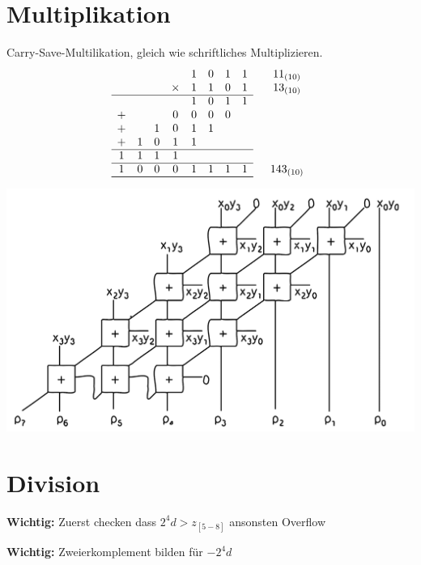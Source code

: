 \documentclass[a4paper,6pt]{article}
\begin{document}
\begin{multicols*}{3}
\section{Multiplikation}

Carry-Save-Multilikation, gleich wie schriftliches Multiplizieren.
$$
\begin{array}{cccccccccc}
      &   &   &   & 1 & 0 & 1 & 1 &   & 11_{(10)} \\
      &   &   & \times & 1 & 1 & 0 & 1 &   & 13_{(10)} \\ \cline{1-8}
      &   &   &   & 1 & 0 & 1 & 1 &   &  \\
    + &   &   & 0 & 0 & 0 & 0 &   &   &  \\
    + &   & 1 & 0 & 1 & 1 &   &   &   &  \\
    + & 1 & 0 & 1 & 1 &   &   &   &   &  \\ \cline{1-8}
    1 & 1 & 1 & 1 &   &   &   &   &   &  \\ \cline{1-8}
    1 & 0 & 0 & 0 & 1 & 1 & 1 & 1 &   & 143_{(10)} \\ \cline{1-8} \cline{1-8}
\end{array}
$$

\begin{center}
    \includegraphics[width=1\linewidth]{resources/Multiplier.png}
\end{center}

\section{Division}


\textbf{Wichtig:} Zuerst checken dass $2^4 d > z_{[5-8]}$ ansonsten Overflow

\textbf{Wichtig:} Zweierkomplement bilden für $-2^4 d$


\end{multicols*}
\end{document}
